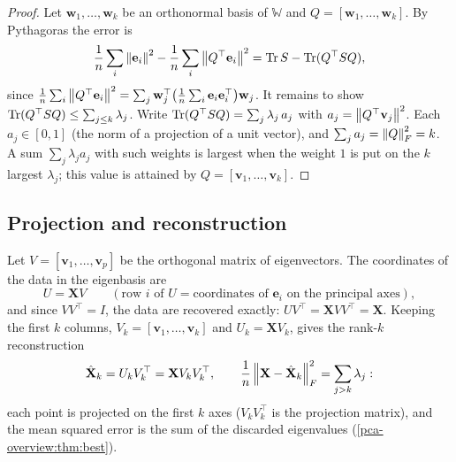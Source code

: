 \begin{notechapter}
\begin{proof}
Let $\mathbf w_1,\dots,\mathbf w_k$ be an orthonormal basis of $\mathbb W$ and $Q = [\mathbf w_1,\dots,\mathbf w_k]$. By Pythagoras
the error is
\[
  \frac1n\sum_i\left\|\mathbf e_i\right\|^2 - \frac1n\sum_i\left\|Q^\top\mathbf e_i\right\|^2 = \operatorname{Tr} S - \operatorname{Tr}(Q^\top SQ),
\]
since
$\frac1n\sum_i\left\|Q^\top\mathbf e_i\right\|^2 = \sum_j\mathbf w_j^\top\bigl(\frac1n\sum_i\mathbf e_i\mathbf e_i^\top\bigr)\mathbf w_j$. It remains to show
$\operatorname{Tr}(Q^\top SQ)\leq\sum_{j\leq k}\lambda_j$. Write $\operatorname{Tr}(Q^\top SQ) = \sum_j\lambda_j\,a_j$ with
$a_j = \left\|Q^\top\mathbf v_j\right\|^2$. Each $a_j\in[0,1]$ (the norm of a projection of a unit vector), and
$\sum_ja_j = \left\|Q\right\|_F^2 = k$. A sum $\sum_j\lambda_ja_j$ with such weights is largest when the
weight $1$ is put on the $k$ largest $\lambda_j$; this value is attained by $Q = [\mathbf v_1,\dots,\mathbf v_k]$.
\end{proof}

\subsection{Projection and reconstruction}

Let $V = [\mathbf v_1,\dots,\mathbf v_p]$ be the orthogonal matrix of eigenvectors. The coordinates of the
data in the eigenbasis are
\[
  U = \mathbf XV\qquad(\text{row } i\text{ of } U = \text{coordinates of }\mathbf e_i\text{ on the principal axes}),
\]
and since $VV^\top = I$, the data are recovered exactly: $UV^\top = \mathbf XVV^\top = \mathbf X$. Keeping the first
$k$ columns, $V_k = [\mathbf v_1,\dots,\mathbf v_k]$ and $U_k = \mathbf XV_k$, gives the rank-$k$ reconstruction
\[
  \hat{\mathbf X}_k = U_kV_k^\top = \mathbf XV_kV_k^\top,
  \qquad
  \frac1n\left\|\mathbf X - \hat{\mathbf X}_k\right\|_F^2 = \sum_{j>k}\lambda_j :
\]
each point is projected on the first $k$ axes ($V_kV_k^\top$ is the projection matrix), and the mean
squared error is the sum of the discarded eigenvalues (\cref{pca-overview:thm:best}).


\end{notechapter}
